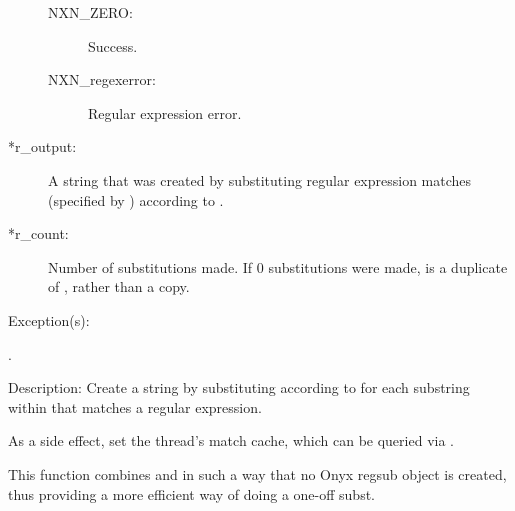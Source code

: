 \begin{capi}
\begin{capilist}
\begin{description}
\begin{description}
			\item[NXN\_ZERO: ] Success.
			\item[NXN\_regexerror: ] Regular expression error.
			\end{description}
		\item[*r\_output: ]
			A string that was created by substituting regular
			expression matches (specified by )
			according to .
		\item[*r\_count: ]
			Number of substitutions made.  If 0 substitutions were
			made,  is a duplicate of
			, rather than a copy.
		\end{description}
	\item[Exception(s): ]
		\begin{description}\item[]
		\item[.]
		\end{description}
	\item[Description: ]
		Create a string by substituting according to 
		for each substring within  that matches a regular
		expression.

		As a side effect, set the thread's match cache, which can be
		queried via .

		This function combines  and
		 in such a way that no Onyx regsub
		object is created, thus providing a more efficient way of doing
		a one-off subst.
	\end{capilist}
\end{capi}
